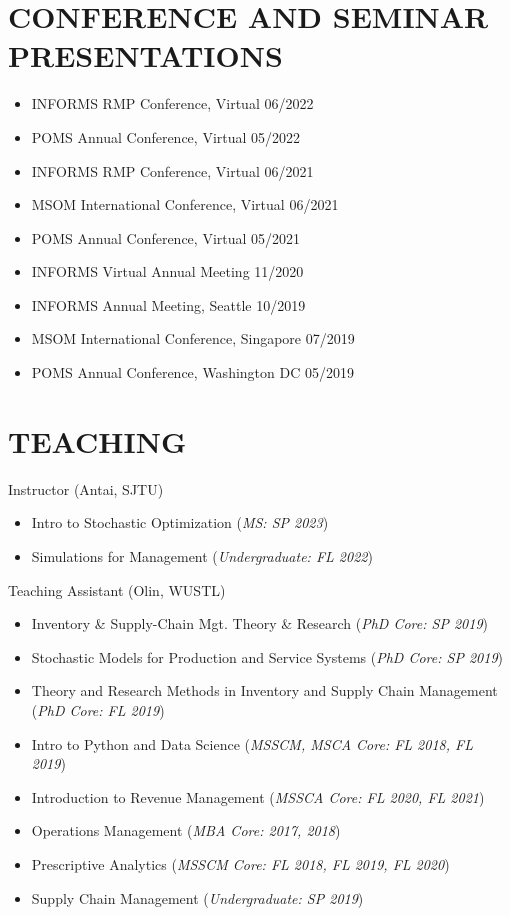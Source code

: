\documentclass[margin]{res} %
\begin{document}
\begin{resume}

\section{CONFERENCE AND SEMINAR PRESENTATIONS}
\begin{itemize}[leftmargin=*]
    \item INFORMS RMP Conference, Virtual \hfill 06/2022
    \item POMS Annual Conference, Virtual \hfill 05/2022
    \item INFORMS RMP Conference, Virtual \hfill 06/2021
    \item MSOM International Conference, Virtual \hfill 06/2021
    \item POMS Annual Conference, Virtual \hfill 05/2021
    \item INFORMS Virtual Annual Meeting \hfill 11/2020
    \item INFORMS Annual Meeting, Seattle \hfill 10/2019
    \item MSOM International Conference, Singapore \hfill 07/2019
    \item POMS Annual Conference, Washington DC \hfill 05/2019
\end{itemize}

\section{TEACHING}
Instructor (Antai, SJTU)
\begin{itemize}
    \item Intro to Stochastic Optimization ({\it MS: SP 2023})
    \item Simulations for Management ({\it Undergraduate: FL 2022})
\end{itemize}
Teaching Assistant (Olin, WUSTL)
\begin{itemize}
    \item Inventory \& Supply-Chain Mgt. Theory \& Research ({\it PhD Core: SP 2019})
    \item Stochastic Models for Production and Service Systems ({\it PhD Core: SP 2019})
    \item Theory and Research Methods in Inventory and Supply Chain Management ({\it PhD Core: FL 2019})
    \item Intro to Python and Data Science ({\it MSSCM, MSCA Core: FL 2018, FL 2019})		
    \item Introduction to Revenue Management ({\it MSSCA Core: FL 2020, FL 2021})
    \item Operations Management ({\it MBA Core: 2017, 2018})
    \item Prescriptive Analytics ({\it MSSCM Core: FL 2018, FL 2019, FL 2020})		
    \item Supply Chain Management ({\it Undergraduate: SP 2019})
\end{itemize}


\end{resume}
\end{document}
